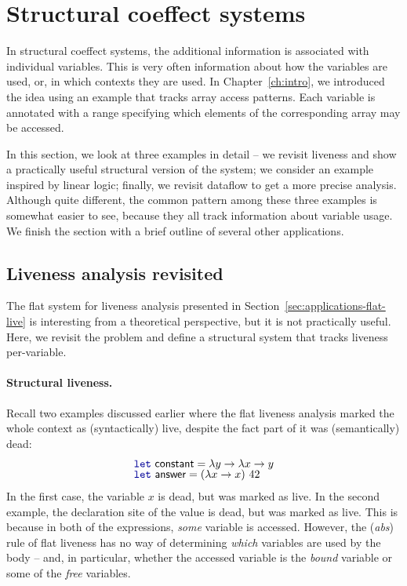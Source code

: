 \section{Structural coeffect systems}
\label{sec:applications-structural}

In structural coeffect systems, the additional information is associated with individual variables.
This is very often information about how the variables are used, or, in which contexts they are used.
In Chapter~\ref{ch:intro}, we introduced the idea using an example that tracks array access patterns.
Each variable is annotated with a range specifying which elements of the corresponding array
may be accessed.

In this section, we look at three examples in detail -- we revisit liveness and show a practically
useful structural version of the system; we consider an example inspired by linear logic; finally,
we revisit dataflow to get a more precise analysis. Although quite different, the common pattern
among these three examples is somewhat easier to see, because they all track information about
variable usage. We finish the section with a brief outline of several other applications.


\subsection{Liveness analysis revisited}
\label{sec:applications-struct-live}

The flat system for liveness analysis presented in Section~\ref{sec:applications-flat-live} is
interesting from a theoretical perspective, but it is not practically useful. Here, we
revisit the problem and define a structural system that tracks liveness per-variable.

\paragraph{Structural liveness.}
Recall two examples discussed earlier where the flat liveness analysis marked the whole context
as (syntactically) live, despite the fact part of it was (semantically) dead:
%
\begin{equation*}
\begin{array}{l}
\kvd{let}~\ident{constant} = \lambda y \rightarrow \lambda x \rightarrow y\\[-0.25em]
\kvd{let}~\ident{answer} = (\lambda x \rightarrow x)~42
\end{array}
\end{equation*}
%
In the first case, the variable $x$ is dead, but was marked as live. In the second example, the
declaration site of the  value is dead, but was marked as live. This is because in
both of the expressions, \emph{some} variable is accessed. However, the (\emph{abs}) rule of flat
liveness has no way of determining \emph{which} variables are used by the body -- and, in particular,
whether the accessed variable is the \emph{bound} variable or some of the \emph{free} variables.

